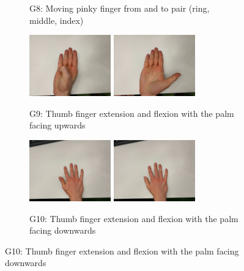 \begin{figure}
\begin{subfigure}[t]{0.5\linewidth}
  \caption{G8: Moving pinky finger from and to pair (ring, middle, index)}
  \end{subfigure}\par\medskip
  \begin{subfigure}[t]{0.5\linewidth}
  \includegraphics[width=100pt]{figures/ext_thumb1}
  \includegraphics[width=100pt]{figures/flx_thumb1}
  \caption{G9: Thumb finger extension and flexion with the palm facing upwards}
  \end{subfigure}
  \hspace*{\fill}
  \begin{subfigure}[t]{0.5\linewidth}
  \includegraphics[width=100pt]{figures/ext_thumb2}
  \includegraphics[width=100pt]{figures/flx_thumb2}
  \caption{G10: Thumb finger extension and flexion with the palm facing downwards}
  \end{subfigure}\par\medskip
\end{figure}
